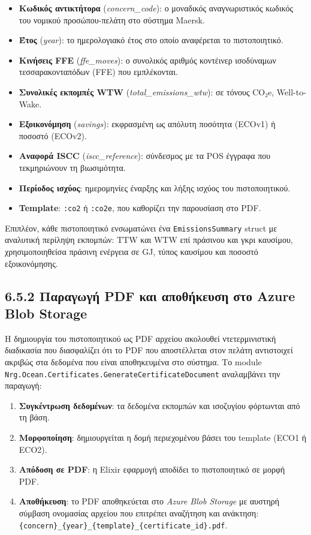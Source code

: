 \begin{itemize}
\tightlist
\item
  \textbf{Κωδικός αντικτήτορα} (\emph{concern\_code}): ο μοναδικός
  αναγνωριστικός κωδικός του νομικού προσώπου-πελάτη στο σύστημα Maersk.
\item
  \textbf{Έτος} (\emph{year}): το ημερολογιακό έτος στο οποίο αναφέρεται
  το πιστοποιητικό.
\item
  \textbf{Κινήσεις FFE} (\emph{ffe\_moves}): ο συνολικός αριθμός
  κοντέινερ ισοδύναμων τεσσαρακονταπόδων (FFE) που εμπλέκονται.
\item
  \textbf{Συνολικές εκπομπές WTW} (\emph{total\_emissions\_wtw}): σε
  τόνους CO₂e, Well-to-Wake.
\item
  \textbf{Εξοικονόμηση} (\emph{savings}): εκφρασμένη ως απόλυτη ποσότητα
  (ECOv1) ή ποσοστό (ECOv2).
\item
  \textbf{Αναφορά ISCC} (\emph{iscc\_reference}): σύνδεσμος με τα POS
  έγγραφα που τεκμηριώνουν τη βιωσιμότητα.
\item
  \textbf{Περίοδος ισχύος}: ημερομηνίες έναρξης και λήξης ισχύος του
  πιστοποιητικού.
\item
  \textbf{Template}: \texttt{:co2} ή \texttt{:co2e}, που καθορίζει την
  παρουσίαση στο PDF.
\end{itemize}

Επιπλέον, κάθε πιστοποιητικό ενσωματώνει ένα \texttt{EmissionsSummary}
struct με αναλυτική περίληψη εκπομπών: TTW και WTW επί πράσινου και γκρι
καυσίμου, χρησιμοποιηθείσα πράσινη ενέργεια σε GJ, τύπος καυσίμου και
ποσοστό εξοικονόμησης.

\subsection{6.5.2 Παραγωγή PDF και αποθήκευση στο Azure Blob
Storage}\label{ux3c0ux3b1ux3c1ux3b1ux3b3ux3c9ux3b3ux3ae-pdf-ux3baux3b1ux3b9-ux3b1ux3c0ux3bfux3b8ux3aeux3baux3b5ux3c5ux3c3ux3b7-ux3c3ux3c4ux3bf-azure-blob-storage}

Η δημιουργία του πιστοποιητικού ως PDF αρχείου ακολουθεί ντετερμινιστική
διαδικασία που διασφαλίζει ότι το PDF που αποστέλλεται στον πελάτη
αντιστοιχεί ακριβώς στα δεδομένα που είναι αποθηκευμένα στο σύστημα. Το
module \texttt{Nrg.Ocean.Certificates.GenerateCertificateDocument}
αναλαμβάνει την παραγωγή:

\begin{enumerate}
\def\labelenumi{\arabic{enumi}.}
\tightlist
\item
  \textbf{Συγκέντρωση δεδομένων}: τα δεδομένα εκπομπών και ισοζυγίου
  φόρτωνται από τη βάση.
\item
  \textbf{Μορφοποίηση}: δημιουργείται η δομή περιεχομένου βάσει του
  template (ECO1 ή ECO2).
\item
  \textbf{Απόδοση σε PDF}: η Elixir εφαρμογή αποδίδει το πιστοποιητικό
  σε μορφή PDF.
\item
  \textbf{Αποθήκευση}: το PDF αποθηκεύεται στο \emph{Azure Blob Storage}
  με αυστηρή σύμβαση ονομασίας αρχείου που επιτρέπει αναζήτηση και
  ανάκτηση:
  \texttt{\{concern\}\_\{year\}\_\{template\}\_\{certificate\_id\}.pdf}.
\end{enumerate}

